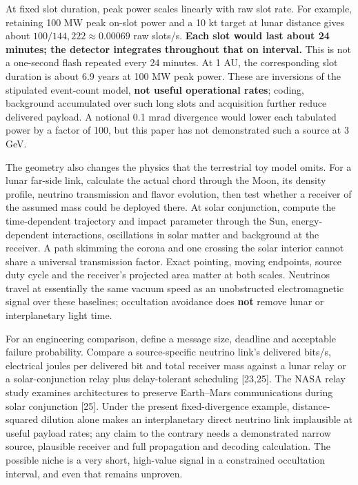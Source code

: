 \documentclass[
]{article}
\begin{document}
At fixed slot duration, peak power scales linearly with raw slot rate.
For example, retaining 100 MW peak on-slot power and a 10 kt target at
lunar distance gives about \(100/144{,}222 \approx 0.00069\) raw
slots/s. \textbf{Each slot would last about 24 minutes; the detector
integrates throughout that on interval.} This is not a one-second flash
repeated every 24 minutes. At 1 AU, the corresponding slot duration is
about 6.9 years at 100 MW peak power. These are inversions of the
stipulated event-count model, \textbf{not useful operational rates};
coding, background accumulated over such long slots and acquisition
further reduce delivered payload. A notional 0.1 mrad divergence would
lower each tabulated power by a factor of 100, but this paper has not
demonstrated such a source at 3 GeV.

The geometry also changes the physics that the terrestrial toy model
omits. For a lunar far-side link, calculate the actual chord through the
Moon, its density profile, neutrino transmission and flavor evolution,
then test whether a receiver of the assumed mass could be deployed
there. At solar conjunction, compute the time-dependent trajectory and
impact parameter through the Sun, energy-dependent interactions,
oscillations in solar matter and background at the receiver. A path
skimming the corona and one crossing the solar interior cannot share a
universal transmission factor. Exact pointing, moving endpoints, source
duty cycle and the receiver's projected area matter at both scales.
Neutrinos travel at essentially the same vacuum speed as an unobstructed
electromagnetic signal over these baselines; occultation avoidance does
\textbf{not} remove lunar or interplanetary light time.

For an engineering comparison, define a message size, deadline and
acceptable failure probability. Compare a source-specific neutrino
link's delivered bits/s, electrical joules per delivered bit and total
receiver mass against a lunar relay or a solar-conjunction relay plus
delay-tolerant scheduling {[}23,25{]}. The NASA relay study examines
architectures to preserve Earth--Mars communications during solar
conjunction {[}25{]}. Under the present fixed-divergence example,
distance-squared dilution alone makes an interplanetary direct neutrino
link implausible at useful payload rates; any claim to the contrary
needs a demonstrated narrow source, plausible receiver and full
propagation and decoding calculation. The possible niche is a very
short, high-value signal in a constrained occultation interval, and even
that remains unproven.
\end{document}
